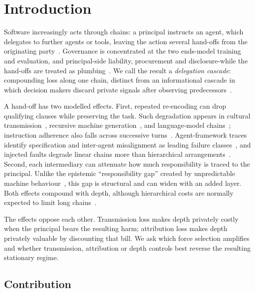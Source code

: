 \documentclass[a4paper,fleqn]{cas-sc}
\begin{document}
\section{Introduction}
\label{sec:intro}

Software increasingly acts through chains: a principal instructs an agent,
which delegates to further agents or tools, leaving the action several
hand-offs from the originating party~\citep{wu2023autogen,fourney2024magentic}.
Governance is concentrated at the two ends-model training and evaluation, and
principal-side liability, procurement and disclosure-while the hand-offs are
treated as plumbing~\citep{shavit2023practices,chan2024visibility}. We call the
result a \emph{delegation cascade}: compounding loss along one chain, distinct
from an informational cascade in which decision makers discard private signals
after observing predecessors~\citep{bikhchandani1992theory}.

A hand-off has two modelled effects. First, repeated re-encoding can drop
qualifying clauses while preserving the task. Such degradation appears in
cultural transmission~\citep{kirby2008cumulative}, recursive machine
generation~\citep{shumailov2024collapse,alemohammad2023mad}, and language-model
chains~\citep{perez2025telephone,acerbi2023transmission}; instruction adherence
also falls across successive turns~\citep{he2024multiif}. Agent-framework
traces identify specification and inter-agent misalignment as leading failure
classes~\citep{cemri2025mast}, and injected faults degrade linear chains more
than hierarchical arrangements~\citep{huang2025resilience}. Second, each
intermediary can attenuate how much responsibility is traced to the principal.
Unlike the epistemic ``responsibility gap'' created by unpredictable machine
behaviour~\citep{matthias2004gap}, this gap is structural and can widen with an
added layer. Both effects compound with depth, although hierarchical costs are
normally expected to limit long chains~\citep{mcafee1995diseconomies}.

The effects oppose each other. Transmission loss makes depth privately costly
when the principal bears the resulting harm; attribution loss makes depth
privately valuable by discounting that bill. We ask which force selection
amplifies and whether transmission, attribution or depth controls best reverse
the resulting stationary regime.

\subsection{Contribution}
\label{sec:contribution}
\end{document}
